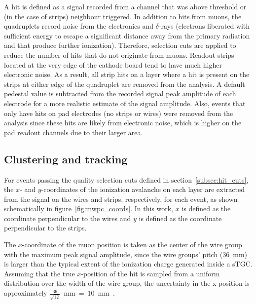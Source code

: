 A hit is defined as a signal recorded from a channel that was above threshold or (in the case of strips) neighbour triggered. In addition to hits from muons, the quadruplets record noise from the electronics and $\delta$-rays (electrons liberated with sufficient energy to escape a significant distance away from the primary radiation and that produce further ionization). Therefore, selection cuts are applied to reduce the number of hits that do not originate from muons. Readout strips located at the very edge of the cathode board tend to have much higher electronic noise.  As a result, all strip hits on a layer where a hit is present on the strips at either edge of the quadruplet are removed from the analysis. A default pedestal value is subtracted from the recorded signal peak amplitude of each electrode for a more realistic estimate of the signal amplitude. Also, events that only have hits on pad electrodes (no strips or wires) were removed from the analysis since these hits are likely from electronic noise, which is higher on the pad readout channels due to their larger area.

\subsection{Clustering and tracking}
\label{subsec:clustering}
For events passing the quality selection cuts defined in section~\ref{subsec:hit_cuts}, the $x$- and $y$-coordinates of the ionization avalanche on each layer are extracted from the signal on the wires and strips, respectively, for each event, as shown schematically in figure~\ref{fig:mwpc_coords}. In this work, $x$ is defined as the coordinate perpendicular to the wires and $y$ is defined as the coordinate perpendicular to the strips.

The $x$-coordinate of the muon position is taken as the center of the wire group with the maximum peak signal amplitude, since the wire groups' pitch (\SI{36}{\milli\meter}) is larger than the typical extent of the ionization charge generated inside a sTGC. Assuming that the true $x$-position of the hit is sampled from a uniform distribution over the width of the wire group, the uncertainty in the x-position is approximately $\frac{36}{\sqrt{12}}$~mm~=~10~mm~\cite{Sauli:117989}.

